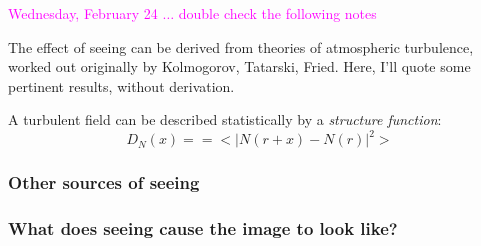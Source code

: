 \documentclass[12pt]{article}
\begin{document}
\textcolor{magenta}{Wednesday, February 24
$\ldots$ double check the following notes}

The effect of seeing can be derived from theories of atmospheric
turbulence, worked out originally by Kolmogorov, Tatarski, Fried.
Here, I'll quote some pertinent results, without derivation.

 A turbulent field can be described statistically by a \emph{structure
 function}: 
    $$ D_N(x) = = <|N(r+x)-N(r)|^2>  $$

\subsubsection*{Other sources of seeing}

\subsubsection*{What does seeing cause the image to look like?}
\end{document}
